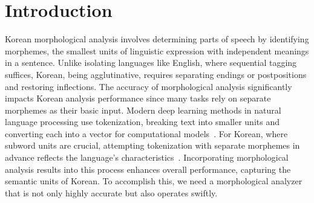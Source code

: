 \documentclass[AMS,STIX2COL]{WileyNJD-v2}
\begin{document}
    \section{Introduction}\label{sec:intro}

    Korean morphological analysis involves determining parts of speech by identifying morphemes, the smallest units of linguistic expression with independent meanings in a sentence.
    Unlike isolating languages like English, where sequential tagging suffices, Korean, being agglutinative, requires separating endings or postpositions and restoring inflections.
    The accuracy of morphological analysis significantly impacts Korean analysis performance since many tasks rely on separate morphemes as their basic input.
    Modern deep learning methods in natural language processing use tokenization, breaking text into smaller units and converting each into a vector for computational models~\cite{Mikolov2013}.
    For Korean, where subword units are crucial, attempting tokenization with separate morphemes in advance reflects the language's characteristics~\cite{SongHJ2021}.
    Incorporating morphological analysis results into this process enhances overall performance, capturing the semantic units of Korean.
    To accomplish this, we need a morphological analyzer that is not only highly accurate but also operates swiftly.
\end{document}
